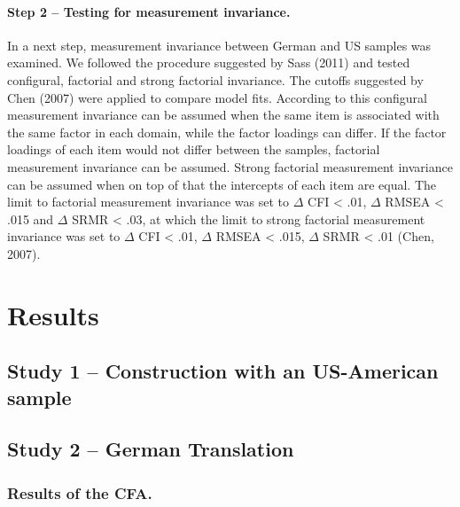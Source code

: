 \documentclass[man]{apa6}
\theoremstyle{definition}
\theoremstyle{definition}
\theoremstyle{definition}
\theoremstyle{remark}
\begin{document}
\hypertarget{step-2-testing-for-measurement-invariance.}{%
\paragraph{Step 2 -- Testing for measurement
invariance.}\label{step-2-testing-for-measurement-invariance.}}

In a next step, measurement invariance between German and US samples was
examined. We followed the procedure suggested by Sass (2011) and tested
configural, factorial and strong factorial invariance. The cutoffs
suggested by Chen (2007) were applied to compare model fits. According
to this configural measurement invariance can be assumed when the same
item is associated with the same factor in each domain, while the factor
loadings can differ. If the factor loadings of each item would not
differ between the samples, factorial measurement invariance can be
assumed. Strong factorial measurement invariance can be assumed when on
top of that the intercepts of each item are equal. The limit to
factorial measurement invariance was set to \(\Delta\) CFI \textless{}
.01, \(\Delta\) RMSEA \textless{} .015 and \(\Delta\) SRMR \textless{}
.03, at which the limit to strong factorial measurement invariance was
set to \(\Delta\) CFI \textless{} .01, \(\Delta\) RMSEA \textless{}
.015, \(\Delta\) SRMR \textless{} .01 (Chen, 2007).

\hypertarget{results-1}{%
\section{Results}\label{results-1}}

\hypertarget{study-1-construction-with-an-us-american-sample}{%
\subsection{Study 1 -- Construction with an US-American
sample}\label{study-1-construction-with-an-us-american-sample}}

\hypertarget{study-2-german-translation-1}{%
\subsection{Study 2 -- German
Translation}\label{study-2-german-translation-1}}

\hypertarget{results-of-the-cfa.}{%
\subsubsection{Results of the CFA.}\label{results-of-the-cfa.}}
\end{document}
